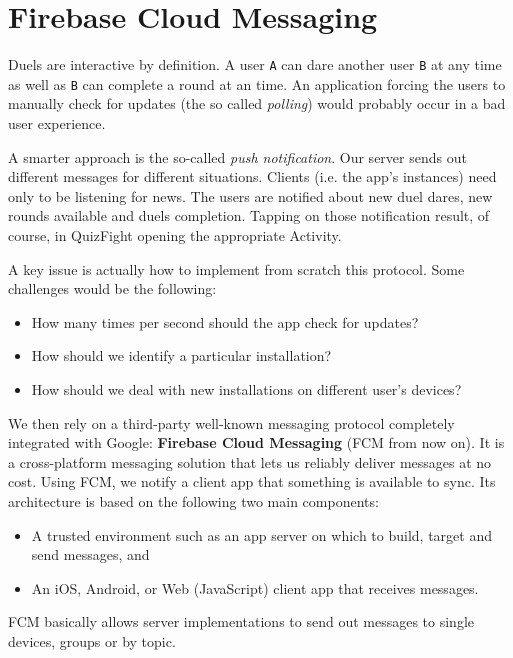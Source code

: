 \section{Firebase Cloud Messaging}\label{sec:fcm}

Duels are interactive by definition. A user \texttt{A} can dare another user
\texttt{B} at any time as well as \texttt{B} can complete a round at an
 time.
An application forcing the users to manually check for updates (the so
called \textit{polling}) would probably occur in a bad user experience.

A smarter approach is the so-called \textit{push notification}.
Our server sends out different messages for different situations.
Clients (i.e. the app's instances) need only to be listening for news.
The users are notified about new duel dares, new rounds available and duels
completion. Tapping on those notification result, of course, in QuizFight
opening the appropriate Activity.

A key issue is actually how to implement from scratch this protocol.
Some challenges would be the following:

\begin{itemize}
	\item How many times per second should the app check for updates?
	\item How should we identify a particular installation?
	\item How should we deal with new installations on different user's devices?
\end{itemize}

We then rely on a third-party well-known messaging protocol completely
integrated with Google: \textbf{Firebase Cloud Messaging} (FCM from now on).
It is a cross-platform messaging solution that lets us reliably deliver
messages at no cost.
Using FCM, we notify a client app that something is available to sync.
Its architecture is based on the following two main components:

\begin{itemize}
	\item A trusted environment such as an app server on which to build,
target and send messages, and
	\item An iOS, Android, or Web (JavaScript) client app that receives
messages.
\end{itemize}

FCM basically allows server implementations to send out messages to single
devices, groups or by topic.

